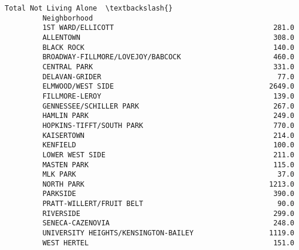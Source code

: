 \documentclass[11pt]{article}
\begin{document}
\begin{Verbatim}[commandchars=\\\{\}]
                                               Total Not Living Alone  \textbackslash{}
         Neighborhood                                                   
         1ST WARD/ELLICOTT                                      281.0   
         ALLENTOWN                                              308.0   
         BLACK ROCK                                             140.0   
         BROADWAY-FILLMORE/LOVEJOY/BABCOCK                      460.0   
         CENTRAL PARK                                           331.0   
         DELAVAN-GRIDER                                          77.0   
         ELMWOOD/WEST SIDE                                     2649.0   
         FILLMORE-LEROY                                         139.0   
         GENNESSEE/SCHILLER PARK                                267.0   
         HAMLIN PARK                                            249.0   
         HOPKINS-TIFFT/SOUTH PARK                               770.0   
         KAISERTOWN                                             214.0   
         KENFIELD                                               100.0   
         LOWER WEST SIDE                                        211.0   
         MASTEN PARK                                            115.0   
         MLK PARK                                                37.0   
         NORTH PARK                                            1213.0   
         PARKSIDE                                               390.0   
         PRATT-WILLERT/FRUIT BELT                                90.0   
         RIVERSIDE                                              299.0   
         SENECA-CAZENOVIA                                       248.0   
         UNIVERSITY HEIGHTS/KENSINGTON-BAILEY                  1119.0   
         WEST HERTEL                                            151.0   
         

\end{Verbatim}
\end{document}
